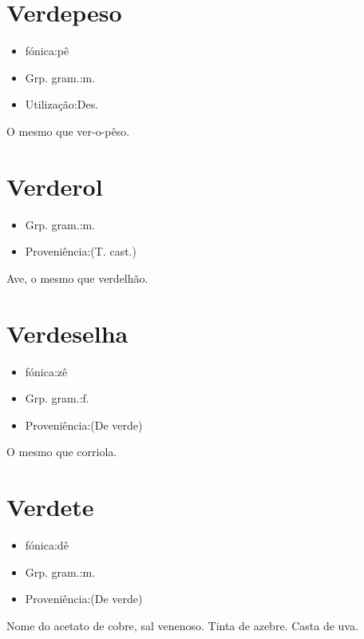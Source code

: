 \documentclass{article}
\begin{document}
\section{Verdepeso}
\begin{itemize}
\item {fónica:pê}
\end{itemize}
\begin{itemize}
\item {Grp. gram.:m.}
\end{itemize}
\begin{itemize}
\item {Utilização:Des.}
\end{itemize}
O mesmo que \textunderscore ver-o-pêso\textunderscore .
\section{Verderol}
\begin{itemize}
\item {Grp. gram.:m.}
\end{itemize}
\begin{itemize}
\item {Proveniência:(T. cast.)}
\end{itemize}
Ave, o mesmo que \textunderscore verdelhão\textunderscore .
\section{Verdeselha}
\begin{itemize}
\item {fónica:zê}
\end{itemize}
\begin{itemize}
\item {Grp. gram.:f.}
\end{itemize}
\begin{itemize}
\item {Proveniência:(De \textunderscore verde\textunderscore )}
\end{itemize}
O mesmo que \textunderscore corriola\textunderscore .
\section{Verdete}
\begin{itemize}
\item {fónica:dê}
\end{itemize}
\begin{itemize}
\item {Grp. gram.:m.}
\end{itemize}
\begin{itemize}
\item {Proveniência:(De \textunderscore verde\textunderscore )}
\end{itemize}
Nome do acetato de cobre, sal venenoso.
Tinta de azebre.
Casta de uva.
\end{document}
